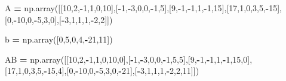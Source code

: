 \documentclass[
]{article}
\newenvironment{Shaded}{\begin{snugshade}}{\end{snugshade}}
\newcommand{\DecValTok}[1]{\textcolor[rgb]{0.00,0.00,0.81}{#1}}
\newcommand{\NormalTok}[1]{#1}
\newcommand{\OperatorTok}[1]{\textcolor[rgb]{0.81,0.36,0.00}{\textbf{#1}}}
\begin{document}
\begin{Shaded}
\begin{Highlighting}[]
\NormalTok{A }\OperatorTok{=}\NormalTok{ np.array([[}\DecValTok{10}\NormalTok{,}\DecValTok{2}\NormalTok{,}\OperatorTok{-}\DecValTok{1}\NormalTok{,}\DecValTok{1}\NormalTok{,}\DecValTok{0}\NormalTok{,}\DecValTok{10}\NormalTok{],[}\OperatorTok{-}\DecValTok{1}\NormalTok{,}\OperatorTok{-}\DecValTok{3}\NormalTok{,}\DecValTok{0}\NormalTok{,}\DecValTok{0}\NormalTok{,}\OperatorTok{-}\DecValTok{1}\NormalTok{,}\DecValTok{5}\NormalTok{],[}\DecValTok{9}\NormalTok{,}\OperatorTok{-}\DecValTok{1}\NormalTok{,}\OperatorTok{-}\DecValTok{1}\NormalTok{,}\DecValTok{1}\NormalTok{,}\OperatorTok{-}\DecValTok{1}\NormalTok{,}\DecValTok{15}\NormalTok{],[}\DecValTok{17}\NormalTok{,}\DecValTok{1}\NormalTok{,}\DecValTok{0}\NormalTok{,}\DecValTok{3}\NormalTok{,}\DecValTok{5}\NormalTok{,}\OperatorTok{-}\DecValTok{15}\NormalTok{],[}\DecValTok{0}\NormalTok{,}\OperatorTok{-}\DecValTok{10}\NormalTok{,}\DecValTok{0}\NormalTok{,}\OperatorTok{-}\DecValTok{5}\NormalTok{,}\DecValTok{3}\NormalTok{,}\DecValTok{0}\NormalTok{],[}\OperatorTok{-}\DecValTok{3}\NormalTok{,}\DecValTok{1}\NormalTok{,}\DecValTok{1}\NormalTok{,}\DecValTok{1}\NormalTok{,}\OperatorTok{-}\DecValTok{2}\NormalTok{,}\DecValTok{2}\NormalTok{]])}

\NormalTok{b }\OperatorTok{=}\NormalTok{ np.array([}\DecValTok{0}\NormalTok{,}\DecValTok{5}\NormalTok{,}\DecValTok{0}\NormalTok{,}\DecValTok{4}\NormalTok{,}\OperatorTok{-}\DecValTok{21}\NormalTok{,}\DecValTok{11}\NormalTok{])}

\NormalTok{AB }\OperatorTok{=}\NormalTok{ np.array([[}\DecValTok{10}\NormalTok{,}\DecValTok{2}\NormalTok{,}\OperatorTok{-}\DecValTok{1}\NormalTok{,}\DecValTok{1}\NormalTok{,}\DecValTok{0}\NormalTok{,}\DecValTok{10}\NormalTok{,}\DecValTok{0}\NormalTok{],[}\OperatorTok{-}\DecValTok{1}\NormalTok{,}\OperatorTok{-}\DecValTok{3}\NormalTok{,}\DecValTok{0}\NormalTok{,}\DecValTok{0}\NormalTok{,}\OperatorTok{-}\DecValTok{1}\NormalTok{,}\DecValTok{5}\NormalTok{,}\DecValTok{5}\NormalTok{],[}\DecValTok{9}\NormalTok{,}\OperatorTok{-}\DecValTok{1}\NormalTok{,}\OperatorTok{-}\DecValTok{1}\NormalTok{,}\DecValTok{1}\NormalTok{,}\OperatorTok{-}\DecValTok{1}\NormalTok{,}\DecValTok{15}\NormalTok{,}\DecValTok{0}\NormalTok{],[}\DecValTok{17}\NormalTok{,}\DecValTok{1}\NormalTok{,}\DecValTok{0}\NormalTok{,}\DecValTok{3}\NormalTok{,}\DecValTok{5}\NormalTok{,}\OperatorTok{-}\DecValTok{15}\NormalTok{,}\DecValTok{4}\NormalTok{],[}\DecValTok{0}\NormalTok{,}\OperatorTok{-}\DecValTok{10}\NormalTok{,}\DecValTok{0}\NormalTok{,}\OperatorTok{-}\DecValTok{5}\NormalTok{,}\DecValTok{3}\NormalTok{,}\DecValTok{0}\NormalTok{,}\OperatorTok{-}\DecValTok{21}\NormalTok{],[}\OperatorTok{-}\DecValTok{3}\NormalTok{,}\DecValTok{1}\NormalTok{,}\DecValTok{1}\NormalTok{,}\DecValTok{1}\NormalTok{,}\OperatorTok{-}\DecValTok{2}\NormalTok{,}\DecValTok{2}\NormalTok{,}\DecValTok{11}\NormalTok{]])}
\end{Highlighting}
\end{Shaded}
\end{document}

